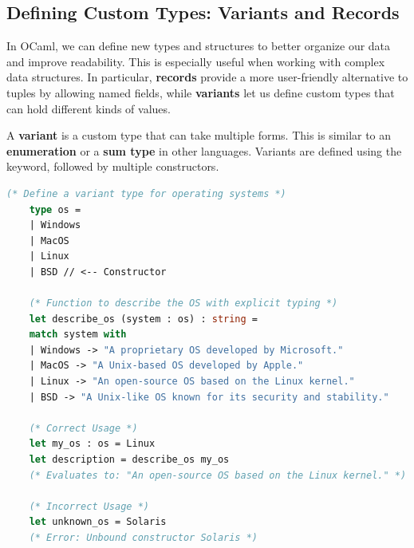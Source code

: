 \subsection{Defining Custom Types: Variants and Records}

In OCaml, we can define new types and structures to better organize our data and improve readability. This is especially useful when working with complex data structures. In particular, \textbf{records} provide a more user-friendly alternative to tuples by allowing named fields, while \textbf{variants} let us define custom types that can hold different kinds of values.

\vspace{2em}

\begin{Def}

A \textbf{variant} is a custom type that can take multiple forms. This is similar to an \textbf{enumeration} or a \textbf{sum type} in other languages. Variants are defined using the  keyword, followed by multiple constructors.

\begin{lstlisting}[language=OCaml, caption={Defining and Using Variants Correctly}, numbers=none]
(* Define a variant type for operating systems *)
    type os =
    | Windows
    | MacOS
    | Linux
    | BSD // <-- Constructor

    (* Function to describe the OS with explicit typing *)
    let describe_os (system : os) : string =
    match system with
    | Windows -> "A proprietary OS developed by Microsoft."
    | MacOS -> "A Unix-based OS developed by Apple."
    | Linux -> "An open-source OS based on the Linux kernel."
    | BSD -> "A Unix-like OS known for its security and stability."

    (* Correct Usage *)
    let my_os : os = Linux
    let description = describe_os my_os
    (* Evaluates to: "An open-source OS based on the Linux kernel." *)

    (* Incorrect Usage *)
    let unknown_os = Solaris
    (* Error: Unbound constructor Solaris *)
\end{lstlisting}
\end{Def}

\newpage

